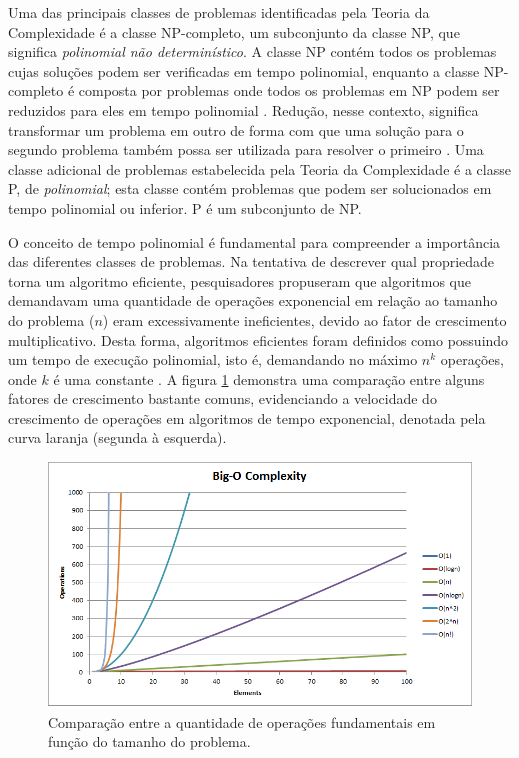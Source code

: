 \documentclass[12pt]{article}
\begin{document}
Uma das principais classes de problemas identificadas pela Teoria da Complexidade é a classe NP-completo, um subconjunto da classe NP, que significa \textit{polinomial não determinístico}. A classe NP contém todos os problemas cujas soluções podem ser verificadas em tempo polinomial, enquanto a classe NP-completo é composta por problemas onde todos os problemas em NP podem ser reduzidos para eles em tempo polinomial \cite{Garey1979}. Redução, nesse contexto, significa transformar um problema em outro de forma com que uma solução para o segundo problema também possa ser utilizada para resolver o primeiro \cite{Sipser1996}. Uma classe adicional de problemas estabelecida pela Teoria da Complexidade é a classe P, de \textit{polinomial}; esta classe contém problemas que podem ser solucionados em tempo polinomial ou inferior. P é um subconjunto de NP.

O conceito de tempo polinomial é fundamental para compreender a importância das diferentes classes de problemas. Na tentativa de descrever qual propriedade torna um algoritmo eficiente, pesquisadores propuseram que algoritmos que demandavam uma quantidade de operações exponencial em relação ao tamanho do problema ($n$) eram excessivamente ineficientes, devido ao fator de crescimento multiplicativo. Desta forma, algoritmos eficientes foram definidos como possuindo um tempo de execução polinomial, isto é, demandando no máximo $n^{k}$ operações, onde $k$ é uma constante \cite{Kleinberg2005}. A figura \ref{fig:complexity} demonstra uma comparação entre alguns fatores de crescimento bastante comuns, evidenciando a velocidade do crescimento de operações em algoritmos de tempo exponencial, denotada pela curva laranja (segunda à esquerda).

\begin{figure}[ht]
    \centering
    \includegraphics[width=14cm]{complexity.png}
    \caption{Comparação entre a quantidade de operações fundamentais em função do tamanho do problema.}
    \label{fig:complexity}
\end{figure}
\end{document}
